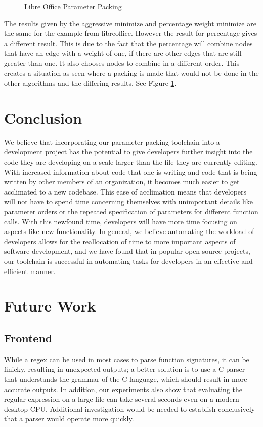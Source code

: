 \documentclass{article}
\begin{document}
\begin{figure}[ht]
{      }
      \caption{Libre Office Parameter Packing}
      \label{fig:libreoffice_example}
\end{figure}

The results given by the aggressive minimize and percentage weight minimize are the same for the example from libreoffice. However the result for percentage gives a different result. This is due to the fact that the percentage will combine nodes that have an edge with a weight of one, if there are other edges that are still greater than one. It also chooses nodes to combine in a different order. This creates a situation as seen where a packing is made that would not be done in the other algorithms and the differing results. See Figure \ref{fig:libreoffice_example}.


\section{Conclusion}
We believe that incorporating our parameter packing toolchain into a development project has the potential to give developers further insight into the code they are developing on a scale larger than the file they are currently editing. With increased information about code that one is writing and code that is being written by other members of an organization, it becomes much easier to get acclimated to a new codebase. This ease of acclimation means that developers will not have to spend time concerning themselves with unimportant details like parameter orders or the repeated specification of parameters for different function calls. With this newfound time, developers will have more time focusing on aspects like new functionality.  In general, we believe automating the workload of developers allows for the reallocation of time to more important aspects of software development, and we have found that in popular open source projects, our toolchain is successful in automating tasks for developers in an effective and efficient manner.

\section{Future Work}
\subsection{Frontend}

While a regex can be used in most cases to parse function signatures, it can be finicky, resulting in unexpected outputs; a better solution is to use a C parser that understands the grammar of the C language, which should result in more accurate outputs. In addition, our experiments also show that evaluating the regular expression on a large file can take several seconds even on a modern desktop CPU. Additional investigation would be needed to establish conclusively that a parser would operate more quickly.
\end{document}

